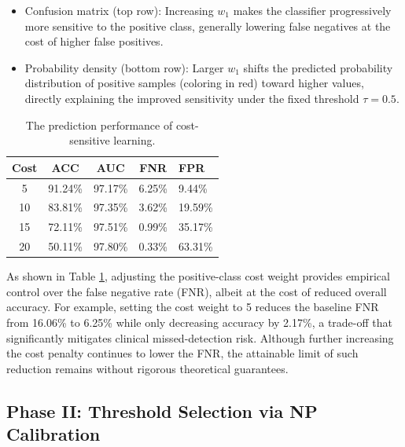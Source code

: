 \documentclass[sigconf,review,anonymous]{acmart}
\theoremstyle{remark}
\begin{document}
\begin{itemize}
    \item Confusion matrix (top row): Increasing $w_1$ makes the classifier progressively more sensitive to the positive class, generally lowering false negatives at the cost of higher false positives.
    \item Probability density (bottom row): Larger $w_1$ shifts the predicted probability distribution of positive samples (coloring in red) toward higher values, directly explaining the improved sensitivity under the fixed threshold $\tau=0.5$.
\end{itemize}

\begin{table}[htbp]
    \caption{The prediction performance of cost-sensitive learning.}
    \label{tab:cost_results}
    \begin{tabular}{ccccl}          
        \toprule
        Cost & ACC & AUC & FNR & FPR \\
        \midrule
        5  & 91.24\% & 97.17\% & 6.25\% & 9.44\% \\
        10 & 83.81\% & 97.35\% & 3.62\% & 19.59\% \\
        15 & 72.11\% & 97.51\% & 0.99\% & 35.17\% \\
        20 & 50.11\% & 97.80\% & 0.33\% & 63.31\% \\
        \bottomrule
    \end{tabular}
    \vskip -0.1in
\end{table}

As shown in Table \ref{tab:cost_results}, adjusting the positive-class cost weight provides empirical control over the false negative rate (FNR), albeit at the cost of reduced overall accuracy. For example, setting the cost weight to 5 reduces the baseline FNR from 16.06\% to 6.25\% while only decreasing accuracy by 2.17\%, a trade-off that significantly mitigates clinical missed-detection risk. Although further increasing the cost penalty continues to lower the FNR, the attainable limit of such reduction remains without rigorous theoretical guarantees.


\subsection{Phase II: Threshold Selection via NP Calibration}
\label{sec:phase2_results}
\end{document}

